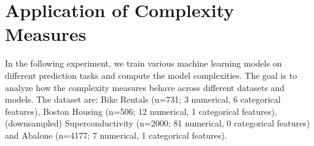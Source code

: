 \documentclass[runningheads]{llncs}\usepackage[]{graphicx}\usepackage[]{color}
\begin{document}












\section{Application of Complexity Measures}
\label{sec:experiment}







In the following experiment, we train various machine learning models on different prediction tasks and compute the model complexities.
The goal is to analyze how the complexity measures behave across different datasets and models.
The dataset are:
Bike Rentals \citep{bike} (n=731; 3 numerical, 6 categorical features),
Boston Housing (n=506; 12 numerical, 1 categorical features),
(downsampled) Superconductivity \citep{hamidieh2018data} (n=2000; 81 numerical, 0 categorical features) and
Abalone \citep{uci} (n=4177; 7 numerical, 1 categorical features).
\end{document}
